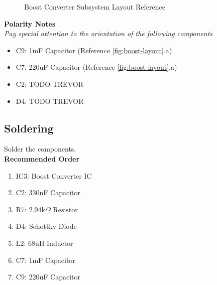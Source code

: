 \documentclass{article}
\newcommand{\resistor}[1]{$\text{#1} \Omega \text{ Resistor}$}
\begin{document}
\begin{figure}[H]
    \centering
        \qquad
        \caption{Boost Converter Subsystem Layout Reference}%
    \label{fig:boost-layout}%
\end{figure}

\noindent \textbf{Polarity Notes}\\
\noindent \textit{Pay special attention to the orientation of the following components}
\begin{itemize}
  \item C9: 1mF Capacitor (Reference \autoref{fig:boost-layout}.a)
  \item C7: 220uF Capacitor (Reference \autoref{fig:boost-layout}.a)
  \item C2: TODO TREVOR
  \item D4: TODO TREVOR
\end{itemize}

\subsection{Soldering}

Solder the components. \\

\noindent \textbf{Recommended Order}

\begin{enumerate}
  \item IC3: Boost Converter IC 
  \item C2: 330nF Capacitor
  \item R7: \resistor{2.94k}
  \item D4: Schottky Diode 
  \item L2: 68uH Inductor
  \item C7: 1mF Capacitor
  \item C9: 220uF Capacitor
\end{enumerate}
\end{document}

